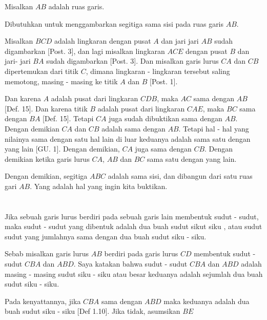 \documentclass[a4paper, 12pt]{book}
\begin{document}
Misalkan $AB$ adalah ruas garis.

Dibutuhkan untuk menggambarkan segitiga sama sisi pada ruas garis $AB$.

Misalkan $BCD$ adalah lingkaran dengan pusat $A$ dan jari jari $AB$ sudah 
digambarkan [Post. 3], dan lagi misalkan lingkaran $ACE$ dengan pusat $B$ 
dan jari- jari $BA$ sudah digambarkan [Post. 3]. Dan misalkan garis lurus 
$CA$ dan $CB$ dipertemukan dari titik $C$, dimana lingkaran - lingkaran 
tersebut saling memotong, masing - masing ke titik $A$ dan $B$ [Post. 1].  


Dan karena $A$ adalah pusat dari lingkaran $CDB$, maka $AC$ sama dengan $AB$
[Def. 15]. Dan karena titik $B$ adalah pusat dari lingkaran $CAE$, maka
$BC$ sama dengan $BA$ [Def. 15]. Tetapi $CA$ juga sudah dibuktikan sama 
dengan $AB$. Dengan demikian $CA$ dan $CB$ adalah sama dengan $AB$. Tetapi
hal - hal yang nilainya sama dengan satu hal lain di luar keduanya adalah sama
satu dengan yang lain [GU. 1]. Dengan demikian, $CA$ juga sama dengan $CB$.  
Dengan demikian ketika garis lurus $CA$, $AB$ dan $BC$ sama satu dengan 
yang lain.

Dengan demikian, segitiga $ABC$ adalah sama sisi, dan dibangun dari
satu ruas gari $AB$. Yang adalah hal yang ingin kita buktikan.  

\setcounter{section}{13}
\section*{\centering \thesection} 
Jika sebuah garis lurus berdiri pada sebuah garis lain membentuk sudut - sudut, maka
sudut - sudut yang dibentuk adalah dua buah sudut sikut siku , atau sudut sudut yang
jumlahnya sama dengan dua buah sudut siku - siku.

Sebab misalkan garis lurus $AB$ berdiri pada garis lurus $CD$ membentuk 
sudut - sudut $CBA$ dan $ABD$. Saya katakan bahwa sudut - sudut $CBA$ dan
$ABD$ adalah masing - masing sudut siku - siku atau besar keduanya adalah 
sejumlah dua buah sudut siku - siku.

Pada kenyattannya, jika $CBA$ sama dengan $ABD$ maka keduanya adalah dua buah 
sudut siku - siku [Def 1.10]. Jika tidak, asumsikan $BE$
\setcounter{section}{29}
\end{document}
